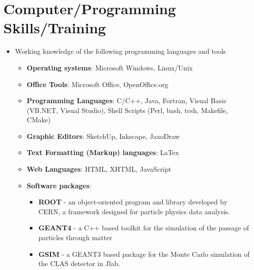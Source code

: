 \documentclass[10pt, letterpaper]{article}
\begin{document}
\section*{Computer/Programming Skills/Training}
\noindent
\begin{itemize}
\item Working knowledge of the following programming languages and tools
  \begin{itemize} 
  \item \textbf{Operating systems}: Microsoft Windows, Linux/Unix 
  \item \textbf{Office Tools}: Microsoft Office, OpenOffice.org
  \item \textbf{Programming Languages}: C/C++, Java, Fortran, Visual Basic (VB.NET, Visual Studio), Shell Scripts (Perl, bash, tcsh, Makefile, CMake)
  \item \textbf{Graphic Editors}: SketchUp, Inkscape, JaxoDraw
  \item \textbf{Text Formatting (Markup) languages}: LaTex
  \item \textbf{Web Languages}: HTML, XHTML, JavaScript %
  \item \textbf{Software packages}:
    \begin{itemize}
    \item \textbf{ROOT} - an object-oriented program and library developed by CERN, a framework designed for particle physics data analysis.
    \item \textbf{GEANT4} - a C++ based toolkit for the simulation of the passage of particles through matter
    \item \textbf{GSIM} - a GEANT3 based package for the Monte Carlo simulation of the CLAS detector in Jlab.	
    \end{itemize}
\end{itemize}
\end{itemize}
\end{document}
